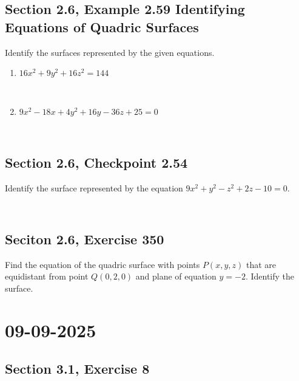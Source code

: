 \documentclass[]{mangos-musings}
\begin{document}
\subsection{Section 2.6, Example 2.59 Identifying Equations of Quadric Surfaces}
Identify the surfaces represented by the given equations.
\begin{enumerate}[label=(\alph*)]
  \item $16x^2 + 9y^2 + 16z^2 = 144$
  \begin{align*}
    \\ \\ \\ \\
  \end{align*}
  \item $9x^2 - 18x + 4y^2 + 16y - 36z + 25 = 0$
  \begin{align*}
    \\ \\ \\ \\
  \end{align*}
\end{enumerate}
\subsection{Section 2.6, Checkpoint 2.54}
Identify the surface represented by the equation $9x^2 + y^2 - z^2 + 2z - 10 = 0$.
\begin{align*}
  \\ \\ \\ \\
\end{align*}

\subsection{Seciton 2.6, Exercise 350}
Find the equation of the quadric surface with points $P(x,y,z)$ that are equidistant from point $Q(0,2,0)$ and plane of equation $y=-2$. Identify the surface. 


\newpage
\section{09-09-2025}
\subsection{Section 3.1, Exercise 8}
\end{document}
